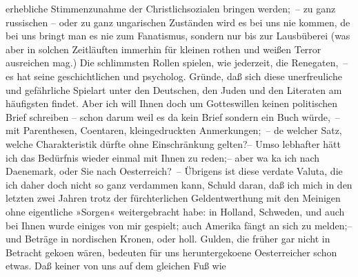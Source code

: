 \begin{ledgroupsized}[t]{13cm}
                    erhebliche Stimmenzunahme der Christlichsozialen bringen werden; – zu ganz russischen – oder zu ganz ungarischen Zuständen wird es bei uns nie kommen, de{\geminationn} bei uns bringt man \strikeout{\textcolor{gray}{×}\-\textcolor{gray}{×}} es nie zum Fanatismus, sondern nur \introOben{}bis\introOben{} zur
                    Lausbüberei (was aber in solchen Zeitläuften immerhin für kleinen rothen und
                    weißen Terror ausreichen mag.) Die schlimmsten Rollen spielen, wie jederzeit,
                    die Renegaten, – es hat seine geschichtlichen \introOben{}und
                        psycholog.\introOben{} Gründe, daß sich diese \introOben{}unerfreuliche und
                        gefährliche\introOben{} Spielart unter den Deutschen, den Juden und den Literaten
                    am häufigsten findet.\pend
           \pstart
           {\pb}Aber ich will Ihnen doch um Gotteswillen
                    keinen politischen Brief schreiben – schon darum weil es da{\geminationn} kein Brief sondern ein Buch würde, – mit
                    Parenthesen, Co{\geminationm}entaren, kleingedruckten
                    Anmerkungen; – de{\geminationn} welcher Satz, welche
                    Charakteristik dürfte ohne Einschränkung gelten?– Umso lebhafter hätt ich das
                    Bedürfnis wieder einmal mit Ihnen zu reden;– aber wa{\geminationn} ka{\geminationn} ich nach Daenemark, oder Sie nach Oesterreich? –\pend
           \pstart
           Übrigens ist  diese verda{\geminationm}te Valuta, die ich daher doch nicht so ganz
                    verdammen kann, \introOben{}Schuld daran\introOben{}, daß ich mich in den
                    letzten zwei Jahren trotz der fürchterlichen Geldentwerthung mit den Meinigen
                    ohne eigentliche »Sorgen« weitergebracht habe: in Holland, Schweden, und auch bei
                    Ihnen wurde einiges von mir gespielt; auch Amerika fängt an sich zu melden;– und  Beträge in nordischen Kronen, oder holl.
                    Gulden, die früher gar nicht in Betracht geko{\geminationm}en
                        {\pb}wären, bedeuten für uns heruntergeko{\geminationm}ene Oesterreicher schon etwas. Daß keiner von uns auf dem gleichen Fuß wie

\end{ledgroupsized}
